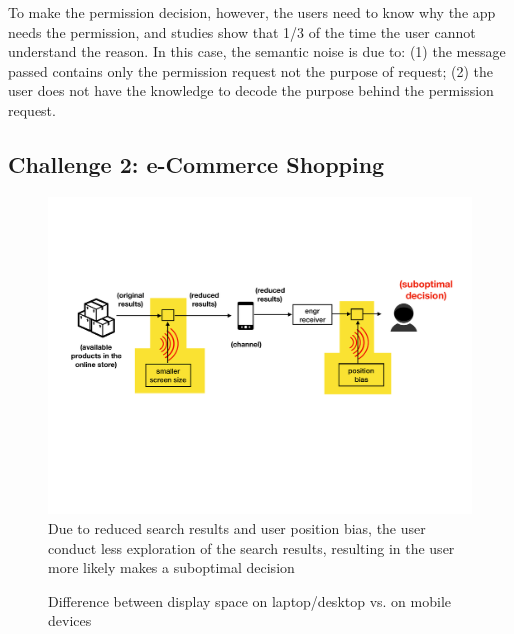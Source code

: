 To make the permission decision, however, the users need to know why the app needs the permission, and studies show that 1/3 of the time the user cannot understand the reason. In this case, the semantic noise is due to: (1) the message passed contains only the permission request not the purpose of request; (2) the user does not have the knowledge to decode the purpose behind the permission request. 

\subsection{Challenge 2: e-Commerce Shopping}


\begin{figure}[h]
\centering
\includegraphics[width=.85\linewidth]{figure/chapter1/gui1_challenge}
\caption{Due to reduced search results and user position bias, the user conduct less exploration of the search results, resulting in the user more likely makes a suboptimal decision\label{fig:ch1:gui1}}
\end{figure} 

\begin{figure}[h]
    \centering
    \hfill
    \caption{Difference between display space on laptop/desktop vs. on mobile devices\label{fig:ch1:interface}}
\end{figure}

